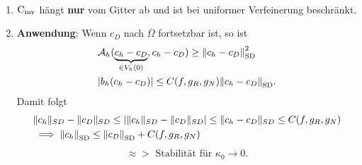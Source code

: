 \begin{remark}\
	\begin{enumerate}[label=\Alph*)]
		\item $ \operatorname{C_{\text{inv}}} $ hängt \textbf{nur} vom Gitter ab und ist bei uniformer Verfeinerung beschränkt.
		\item \textbf{Anwendung}: Wenn $ c_D $ nach $ \overline{\Omega} $ fortsetzbar ist, so ist
		\begin{align*}
				&\mathcal{A}_h(\underbrace{c_h-c_D}_{\in V_h(0)}, c_h - c_D ) \geq \norm{c_h - c_D}_{\operatorname{\text{SD}}}^2 \\
				&\abs{b_h(c_h-c_D)} \leq C(f,g_R, g_N) \norm{c_h - c_D}_{\operatorname{\text{SD}}}.
	   \end{align*}
	   Damit folgt
	   \begin{align*}
	        &\|c_h\|_{SD} - \|c_D\|_{SD} \le \left| \|c_h\|_{SD}- \| c_D\|_{SD} \right| \le \|c_h-c_D\|_{SD} \le C(f,g_R,g_N)\\ &\implies
	        \norm{c_h}_{\operatorname{\text{SD}}} \leq \norm{c_D}_{\operatorname{\text{SD}}} + C(f,g_R,g_N)
		\end{align*}
		\begin{align*}
				\approx> \text{ Stabilität für } \kappa_0 \to 0.
		\end{align*}
	\end{enumerate}
\end{remark}
